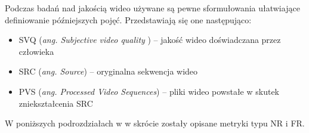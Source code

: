 Podczas badań nad jakością  wideo używane są pewne sformułowania ułatwiające definiowanie późniejszych pojęć. Przedstawiają się one następująco:
\begin{itemize}[label=$\bullet$]
	\item SVQ (\emph{ang. Subjective video quality }) -- jakość wideo doświadczana przez człowieka 
	\item SRC (\emph{ang. Source}) -- oryginalna sekwencja wideo
	\item PVS (\emph{ang. Processed Video Sequences}) -- pliki wideo powstałe w skutek zniekształcenia SRC
\end{itemize}


W poniższych podrozdziałach w w skrócie zostały opisane metryki typu NR i FR.

